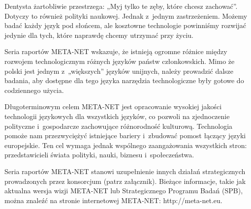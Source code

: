\begin{multicols}{2}
Dentysta żartobliwie przestrzega: „Myj tylko te zęby, które
chcesz zachować”. Dotyczy to również polityki naukowej. Jednak
z~jednym zastrzeżeniem. Możemy badać każdy język pod słońcem,
ale kosztowne technologie powinniśmy rozwijać jedynie dla tych,
które naprawdę chcemy utrzymać przy życiu. 

Seria raportów META-NET wskazuje, że istnieją ogromne różnice
między rozwojem technologicznym różnych języków państw
członkowskich. Mimo że polski jest jednym z~„większych”
języków unijnych, należy prowadzić dalsze badania, aby dostępne
dla tego języka narzędzia technologiczne były gotowe do codziennego
użycia. 


Długoterminowym celem META-NET jest opracowanie wysokiej jakości
technologii językowych dla wszystkich języków, co pozwoli na
zjednoczenie polityczne i~gospodarcze zachowujące różnorodność
kulturową. Technologia pomoże nam przezwyciężyć istniejące
bariery i~zbudować pomost łączący języki europejskie. Ten cel
wymaga jednak wspólnego zaangażowania wszystkich stron:
przedstawicieli świata polityki, nauki, biznesu i~społeczeństwa. 

Seria raportów META-NET stanowi uzupełnienie innych działań
strategicznych prowadzonych przez konsorcjum (patrz załącznik).
Bieżące informacje, takie jak aktualna wersja wizji
META-NET\cite{Meta1} lub Strategicznego Programu Badań (SPB), można
znaleźć na stronie internetowej META-NET: http://meta-net.eu. 

\end{multicols} \clearpage 


